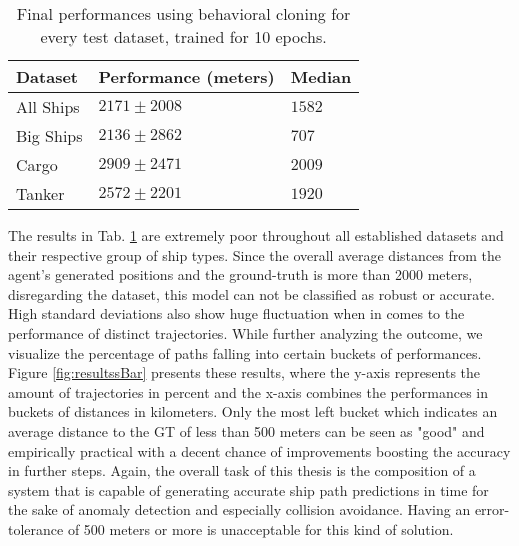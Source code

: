 \begin{table}[H]
\centering
\begin{tabular}{|l|l|l|}
\hline
\textbf{Dataset} & \textbf{Performance (meters)}  & \textbf{Median} \\ \hline
All Ships        & $2171 \pm 2008$                & $1582$          \\ \hline
Big Ships        & $2136 \pm 2862$                & $707$           \\ \hline
Cargo            & $2909 \pm 2471$                & $2009$          \\ \hline
Tanker           & $2572 \pm 2201$ & $1920$          \\ \hline
\end{tabular}
\caption{Final performances using behavioral cloning for every test dataset, trained for 10 epochs.}
\label{tab:rlResults1}
\end{table}
The results in Tab. \ref{tab:rlResults1} are extremely poor throughout all established datasets and their respective group of ship types. Since the overall average distances from the agent's generated positions and the ground-truth is more than 2000 meters, disregarding the dataset, this model can not be classified as robust or accurate. High standard deviations also show huge fluctuation when in comes to the performance of distinct trajectories. While further analyzing the outcome, we visualize the percentage of paths falling into certain buckets of performances. Figure \ref{fig:resultssBar} presents these results, where the y-axis represents the amount of trajectories in percent and the x-axis combines the performances in buckets of distances in kilometers. Only the most left bucket which indicates an average distance to the GT of less than 500 meters can be seen as "good" and empirically practical with a decent chance of improvements boosting the accuracy in further steps. Again, the overall task of this thesis is the composition of a system that is capable of generating accurate ship path predictions in time for the sake of anomaly detection and especially collision avoidance. Having an error-tolerance of 500 meters or more is unacceptable for this kind of solution.
